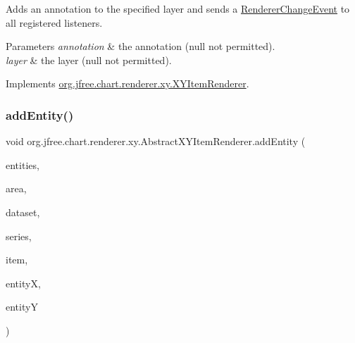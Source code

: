 Adds an annotation to the specified layer and sends a \mbox{\hyperlink{}{Renderer\+Change\+Event}} to all registered listeners.


\begin{DoxyParams}{Parameters}
{\em annotation} & the annotation ({\ttfamily null} not permitted). \\
\hline
{\em layer} & the layer ({\ttfamily null} not permitted). \\
\hline
\end{DoxyParams}


Implements \mbox{\hyperlink{interfaceorg_1_1jfree_1_1chart_1_1renderer_1_1xy_1_1_x_y_item_renderer_a3d2e2daa0ed45459a0059b02cdf009b3}{org.\+jfree.\+chart.\+renderer.\+xy.\+X\+Y\+Item\+Renderer}}.

\mbox{\label{classorg_1_1jfree_1_1chart_1_1renderer_1_1xy_1_1_abstract_x_y_item_renderer_af2722e6d994c29c591b02b8400533e14}} 
\subsubsection{\texorpdfstring{add\+Entity()}{addEntity()}}
{\footnotesize\ttfamily void org.\+jfree.\+chart.\+renderer.\+xy.\+Abstract\+X\+Y\+Item\+Renderer.\+add\+Entity (\begin{DoxyParamCaption}\item[{\mbox{\hyperlink{interfaceorg_1_1jfree_1_1chart_1_1entity_1_1_entity_collection}{Entity\+Collection}}}]{entities,  }\item[{Shape}]{area,  }\item[{\mbox{\hyperlink{interfaceorg_1_1jfree_1_1data_1_1xy_1_1_x_y_dataset}{X\+Y\+Dataset}}}]{dataset,  }\item[{int}]{series,  }\item[{int}]{item,  }\item[{double}]{entityX,  }\item[{double}]{entityY }\end{DoxyParamCaption})\hspace{0.3cm}{\ttfamily [protected]}}

